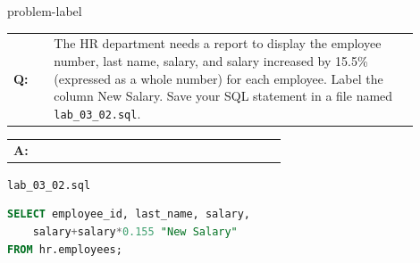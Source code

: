 \begin{problem}{}{problem-label}

\begin{tabular}{@{}l p{0.9\linewidth}@{}}
  \textbf{Q:} & The HR department needs a report to display the employee number, last name, salary, and
salary increased by 15.5\% (expressed as a whole number) for each employee. Label the column
New Salary. Save your SQL statement in a file named \texttt{lab\_03\_02.sql}.
\end{tabular}

\begin{tabular}{@{}l p{0.9\linewidth}@{}}
  \textbf{A:} & 
\end{tabular}

\hspace{1.5em}\texttt{lab\_03\_02.sql}
\begin{lstlisting}[language=SQL]
SELECT employee_id, last_name, salary, 
    salary+salary*0.155 "New Salary"
FROM hr.employees;
\end{lstlisting}

\vspace{1em}

\end{problem}

